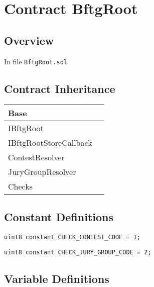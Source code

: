 
\chapter{Contract BftgRoot}

\minitoc

\section{Overview}


In file {\tt BftgRoot.sol}

\section{Contract Inheritance}


\noindent\begin{tabular}{|l|p{5cm}|}\hline
Base & \\\hline
IBftgRoot & \\\hline
IBftgRootStoreCallback & \\\hline
ContestResolver & \\\hline
JuryGroupResolver & \\\hline
Checks & \\\hline
\end{tabular}


\section{Constant Definitions}


\begin{lstlisting}[firstnumber=18]
    uint8 constant CHECK_CONTEST_CODE = 1;
\end{lstlisting}

\begin{lstlisting}[firstnumber=19]
    uint8 constant CHECK_JURY_GROUP_CODE = 2;
\end{lstlisting}

\section{Variable Definitions}


